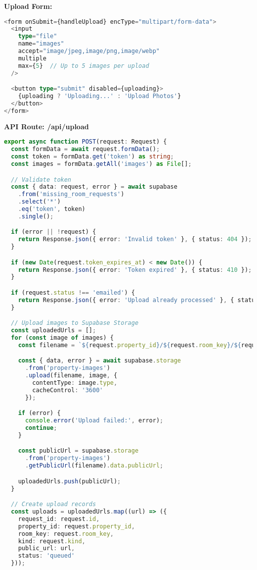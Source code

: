 \documentclass[11pt,a4paper]{article}
\begin{document}
\textbf{Upload Form:}
\begin{lstlisting}[language=TypeScript, caption=Upload Form Component]
<form onSubmit={handleUpload} encType="multipart/form-data">
  <input
    type="file"
    name="images"
    accept="image/jpeg,image/png,image/webp"
    multiple
    max={5}  // Up to 5 images per upload
  />

  <button type="submit" disabled={uploading}>
    {uploading ? 'Uploading...' : 'Upload Photos'}
  </button>
</form>
\end{lstlisting}

\textbf{API Route: /api/upload}

\begin{lstlisting}[language=TypeScript, caption=Upload API Handler]
export async function POST(request: Request) {
  const formData = await request.formData();
  const token = formData.get('token') as string;
  const images = formData.getAll('images') as File[];

  // Validate token
  const { data: request, error } = await supabase
    .from('missing_room_requests')
    .select('*')
    .eq('token', token)
    .single();

  if (error || !request) {
    return Response.json({ error: 'Invalid token' }, { status: 404 });
  }

  if (new Date(request.token_expires_at) < new Date()) {
    return Response.json({ error: 'Token expired' }, { status: 410 });
  }

  if (request.status !== 'emailed') {
    return Response.json({ error: 'Upload already processed' }, { status: 409 });
  }

  // Upload images to Supabase Storage
  const uploadedUrls = [];
  for (const image of images) {
    const filename = `${request.property_id}/${request.room_key}/${request.id}/${Date.now()}_${randomUUID()}.jpg`;

    const { data, error } = await supabase.storage
      .from('property-images')
      .upload(filename, image, {
        contentType: image.type,
        cacheControl: '3600'
      });

    if (error) {
      console.error('Upload failed:', error);
      continue;
    }

    const publicUrl = supabase.storage
      .from('property-images')
      .getPublicUrl(filename).data.publicUrl;

    uploadedUrls.push(publicUrl);
  }

  // Create upload records
  const uploads = uploadedUrls.map((url) => ({
    request_id: request.id,
    property_id: request.property_id,
    room_key: request.room_key,
    kind: request.kind,
    public_url: url,
    status: 'queued'
  }));


\end{lstlisting}
\end{document}

